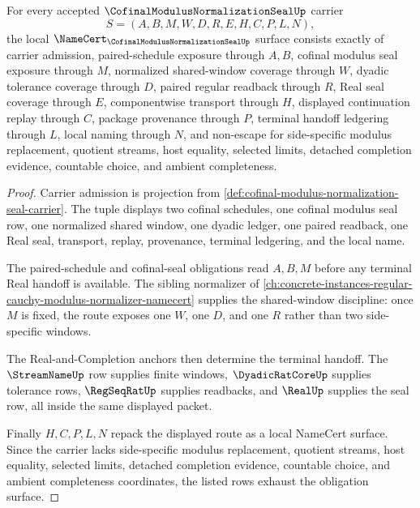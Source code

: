 \begin{theorem}
\label{thm:cofinal-modulus-normalization-seal-namecert-obligations}
For every accepted $\CofinalModulusNormalizationSealUp$ carrier
$$
S=(A,B,M,W,D,R,E,H,C,P,L,N),
$$
the local $\NameCert_{\CofinalModulusNormalizationSealUp}$ surface consists exactly of carrier admission, paired-schedule exposure through $A,B$, cofinal modulus seal exposure through $M$, normalized shared-window coverage through $W$, dyadic tolerance coverage through $D$, paired regular readback through $R$, Real seal coverage through $E$, componentwise transport through $H$, displayed continuation replay through $C$, package provenance through $P$, terminal handoff ledgering through $L$, local naming through $N$, and non-escape for side-specific modulus replacement, quotient streams, host equality, selected limits, detached completion evidence, countable choice, and ambient completeness.
\end{theorem}
\begin{proof}
Carrier admission is projection from \autoref{def:cofinal-modulus-normalization-seal-carrier}. The tuple displays two cofinal schedules, one cofinal modulus seal row, one normalized shared window, one dyadic ledger, one paired readback, one Real seal, transport, replay, provenance, terminal ledgering, and the local name.

The paired-schedule and cofinal-seal obligations read $A,B,M$ before any terminal Real handoff is available. The sibling normalizer of \autoref{ch:concrete-instances-regular-cauchy-modulus-normalizer-namecert} supplies the shared-window discipline: once $M$ is fixed, the route exposes one $W$, one $D$, and one $R$ rather than two side-specific windows.

The Real-and-Completion anchors then determine the terminal handoff. The $\StreamNameUp$ row supplies finite windows, $\DyadicRatCoreUp$ supplies tolerance rows, $\RegSeqRatUp$ supplies readbacks, and $\RealUp$ supplies the seal row, all inside the same displayed packet.

Finally $H,C,P,L,N$ repack the displayed route as a local NameCert surface. Since the carrier lacks side-specific modulus replacement, quotient streams, host equality, selected limits, detached completion evidence, countable choice, and ambient completeness coordinates, the listed rows exhaust the obligation surface.
\end{proof}

